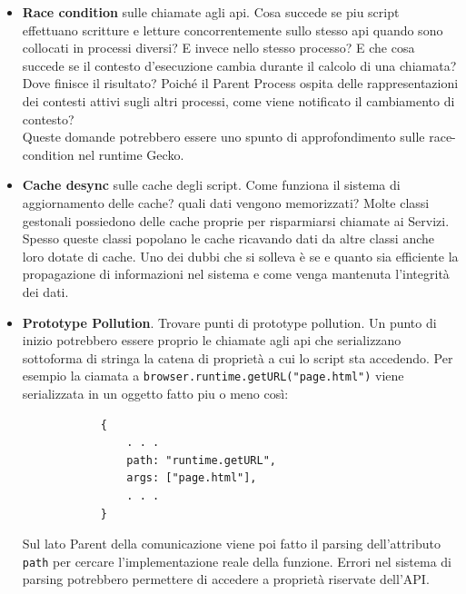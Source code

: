 \documentclass{sapthesis}
\newcommand{\bold}[1]{\textbf{#1}}
\newcommand{\code}[1]{\texttt{#1}}
\begin{document}
        \begin{itemize}
            \item \bold{Race condition} sulle chiamate agli api. Cosa succede se piu script effettuano scritture
                    e letture concorrentemente sullo stesso api quando sono collocati in processi diversi? E invece
                    nello stesso processo? E che cosa succede se il contesto d'esecuzione cambia durante il calcolo
                    di una chiamata? Dove finisce il risultato? Poiché il Parent Process ospita delle rappresentazioni
                    dei contesti attivi sugli altri processi, come viene notificato il cambiamento di contesto?\\
                    Queste domande potrebbero essere uno spunto di approfondimento sulle race-condition nel runtime
                    Gecko.

            \item \bold{Cache desync} sulle cache degli script. Come funziona il sistema di aggiornamento delle cache?
                    quali dati vengono memorizzati? Molte classi gestonali possiedono delle cache proprie per risparmiarsi
                    chiamate ai Servizi. Spesso queste classi popolano le cache ricavando dati da altre classi anche loro
                    dotate di cache. Uno dei dubbi che si solleva è se e quanto sia efficiente la propagazione di informazioni
                    nel sistema e come venga mantenuta l'integrità dei dati.

            \item \bold{Prototype Pollution}. Trovare punti di prototype pollution. Un punto di inizio 
                    potrebbero essere proprio le chiamate agli api che serializzano sottoforma di stringa
                    la catena di proprietà a cui lo script sta accedendo. Per esempio la ciamata a
                    \code{browser.runtime.getURL("page.html")} viene serializzata in un oggetto fatto piu o meno così:
                    \begin{lstlisting}
            {
                . . .
                path: "runtime.getURL",
                args: ["page.html"],
                . . .
            }
                    \end{lstlisting}
                    Sul lato Parent della comunicazione viene poi fatto il parsing dell'attributo \code{path}
                    per cercare l'implementazione reale della funzione. Errori nel sistema di parsing potrebbero
                    permettere di accedere a proprietà riservate dell'API.


\end{itemize}
\end{document}
